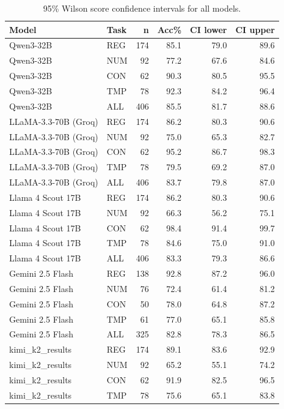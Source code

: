 \begin{table}[h]
\centering
\small
\caption{95\% Wilson score confidence intervals for all models.}
\label{tab:wilson_ci}
\begin{tabular}{llrrrr}
\toprule
\textbf{Model} & \textbf{Task} & \textbf{n} & \textbf{Acc\%} & \textbf{CI lower} & \textbf{CI upper} \\
\midrule
Qwen3-32B & REG & 174 & 85.1 & 79.0 & 89.6 \\
Qwen3-32B & NUM & 92 & 77.2 & 67.6 & 84.6 \\
Qwen3-32B & CON & 62 & 90.3 & 80.5 & 95.5 \\
Qwen3-32B & TMP & 78 & 92.3 & 84.2 & 96.4 \\
Qwen3-32B & ALL & 406 & 85.5 & 81.7 & 88.6 \\
\midrule
LLaMA-3.3-70B (Groq) & REG & 174 & 86.2 & 80.3 & 90.6 \\
LLaMA-3.3-70B (Groq) & NUM & 92 & 75.0 & 65.3 & 82.7 \\
LLaMA-3.3-70B (Groq) & CON & 62 & 95.2 & 86.7 & 98.3 \\
LLaMA-3.3-70B (Groq) & TMP & 78 & 79.5 & 69.2 & 87.0 \\
LLaMA-3.3-70B (Groq) & ALL & 406 & 83.7 & 79.8 & 87.0 \\
\midrule
Llama 4 Scout 17B & REG & 174 & 86.2 & 80.3 & 90.6 \\
Llama 4 Scout 17B & NUM & 92 & 66.3 & 56.2 & 75.1 \\
Llama 4 Scout 17B & CON & 62 & 98.4 & 91.4 & 99.7 \\
Llama 4 Scout 17B & TMP & 78 & 84.6 & 75.0 & 91.0 \\
Llama 4 Scout 17B & ALL & 406 & 83.3 & 79.3 & 86.6 \\
\midrule
Gemini 2.5 Flash & REG & 138 & 92.8 & 87.2 & 96.0 \\
Gemini 2.5 Flash & NUM & 76 & 72.4 & 61.4 & 81.2 \\
Gemini 2.5 Flash & CON & 50 & 78.0 & 64.8 & 87.2 \\
Gemini 2.5 Flash & TMP & 61 & 77.0 & 65.1 & 85.8 \\
Gemini 2.5 Flash & ALL & 325 & 82.8 & 78.3 & 86.5 \\
\midrule
kimi_k2_results & REG & 174 & 89.1 & 83.6 & 92.9 \\
kimi_k2_results & NUM & 92 & 65.2 & 55.1 & 74.2 \\
kimi_k2_results & CON & 62 & 91.9 & 82.5 & 96.5 \\
kimi_k2_results & TMP & 78 & 75.6 & 65.1 & 83.8 \\

\end{tabular}
\end{table}
